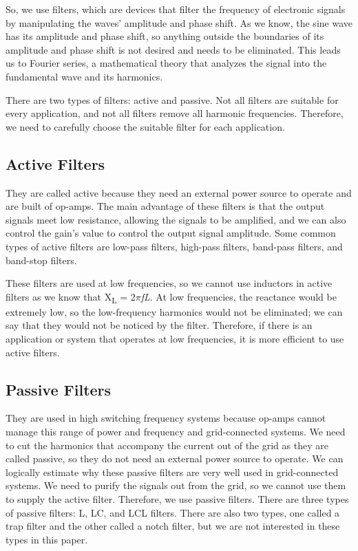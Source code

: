 \documentclass[12pt,a4paper]{book}
\begin{document}
So, we use filters, which are devices that filter the frequency of electronic signals by manipulating the waves' amplitude and phase shift. As we know, the sine wave has its amplitude and phase shift, so anything outside the boundaries of its amplitude and phase shift is not desired and needs to be eliminated. This leads us to Fourier series, a mathematical theory that analyzes the signal into the fundamental wave and its harmonics.

There are two types of filters: active and passive. Not all filters are suitable for every application, and not all filters remove all harmonic frequencies. Therefore, we need to carefully choose the suitable filter for each application.

\subsection{Active Filters}
They are called active because they need an external power source to operate and are built of op-amps. The main advantage of these filters is that the output signals meet low resistance, allowing the signals to be amplified, and we can also control the gain's value to control the output signal amplitude. Some common types of active filters are low-pass filters, high-pass filters, band-pass filters, and band-stop filters.

These filters are used at low frequencies, so we cannot use inductors in active filters as we know that X\textsubscript{L} = 2\(\pi\)\emph{fL}. At low frequencies, the reactance would be extremely low, so the low-frequency harmonics would not be eliminated; we can say that they would not be noticed by the filter. Therefore, if there is an application or system that operates at low frequencies, it is more efficient to use active filters.

\subsection{Passive Filters}
They are used in high switching frequency systems because op-amps cannot manage this range of power and frequency and grid-connected systems. We need to cut the harmonics that accompany the current out of the grid as they are called passive, so they do not need an external power source to operate. We can logically estimate why these passive filters are very well used in grid-connected systems. We need to purify the signals out from the grid, so we cannot use them to supply the active filter. Therefore, we use passive filters. There are three types of passive filters: L, LC, and LCL filters. There are also two types, one called a trap filter and the other called a notch filter, but we are not interested in these types in this paper.
\end{document}
